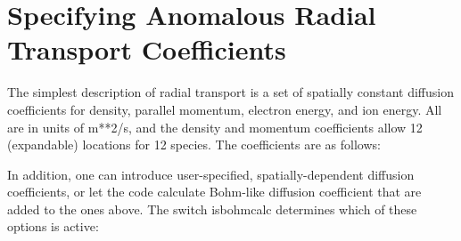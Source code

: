 \documentclass [12pt]{article}
\def\hsa{\hskip.4truein}
\def\hsp6{\hskip.6truein}
\begin{document}
\section{Specifying Anomalous Radial Transport Coefficients}

The simplest description of radial transport is a set of spatially constant
diffusion coefficients for density, parallel momentum, electron energy, and
ion energy. All are in units of m**2/s, and the density and momentum
coefficients allow 12 (expandable) locations for 12 species. The coefficients
are as follows: 
{\sf
{}
}
In addition, one can introduce user-specified, spatially-dependent diffusion
coefficients, or let the code calculate Bohm-like diffusion coefficient that are 
added to the ones above.  The switch isbohmcalc determines which of these 
 options is active:
\end{document}
